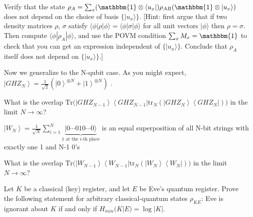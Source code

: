 \documentclass[a4paper,10pt,landscape,twocolumn]{scrartcl}
\newcommand{\ket}[1]{| #1 \rangle}
\newcommand{\bra}[1]{\langle #1 |}
\begin{document}
\begin{exercise}
Verify that the state $\rho_A=\sum_x (\mathbbm{1}\otimes \bra{u_x})\rho_{AB}(\mathbbm{1}\otimes \ket{u_x})$ does not depend on the choice of
basis $\{\ket{u_x}\}$. [Hint: first argue that if two density matrices $\rho$, $\sigma$ satisfy $\bra{\phi}\rho\ket{\phi}=\bra{\phi}\sigma\ket{\phi}$ 
for all unit vectors $\ket{\phi}$ then $\rho=\sigma$. Then compute $\bra{\phi}\rho_A\ket{\phi}$, and use the POVM condition
$\sum_x M_x=\mathbbm{1}$ to check that you can get an expression independent of $\{\ket{u_x}\}$. Conclude that $\rho_A$
itself does not depend on $\{\ket{u_x}\}$.]
\end{exercise}


\begin{exercise}
\begin{subex}
 Now we generalize to the N-qubit case. As you might expect, $\left| GHZ_ N \right\rangle =\frac{1}{\sqrt {2}} (\left| 0 \right\rangle ^{\otimes N}+\left| 1 \right\rangle ^{\otimes N})$ .

What is the overlap $\text {Tr}\Big(\left| GHZ_{N-1} \right\rangle\left\langle {GHZ_{N-1}}\right| \text {tr}_ N\left(\left| GHZ_ N \right\rangle \left\langle GHZ_ N \right|\right)\Big)$ in the limit $N \rightarrow \infty$? 
\end{subex}

\begin{subex}
$\left| W_ N \right\rangle= \frac{1}{\sqrt{N}}\sum_{i=1}^N \underset{1\text{ at the $i$-th place}}{\underbrace{\ket{0\cdots 010\cdots 0}}}$ is an equal superposition of all N-bit strings with exactly one 1 and N-1 0's

What is the overlap $\text {Tr}\Big(\left| W_{N-1} \right\rangle \left\langle {W_{N-1}}\right| \text {tr}_ N\left(\left| W_ N \right\rangle \left\langle W_N \right|\right)\Big)$ in the limit $N \rightarrow \infty$? 
\end{subex}
\end{exercise}

\begin{exercise}
	Let $K$ be a classical (key) register, and let $E$ be Eve's quantum register. Prove the following statement for arbitrary classical-quantum states $\rho_{KE}$: Eve is ignorant about $K$ if and only if $H_{min}(K|E) = \log|K|$.
\end{exercise}
\end{document}
